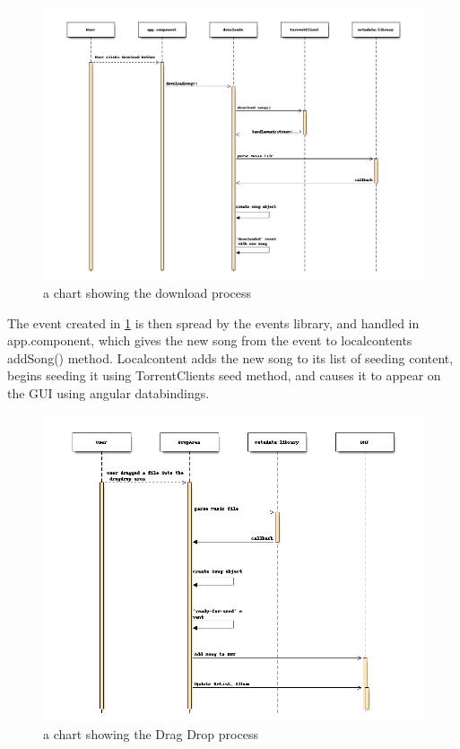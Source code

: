 \begin{figure}[H]
	\centerline{
	\includegraphics[width=1.5\linewidth]{gfx/downloadsong.png}
	}
	\caption{a chart showing the download process}
	\label{fig:downloadsong}
\end{figure}

The event created in \ref{fig:downloadsong} is then spread by the events library,
and handled in app.component, 
which gives the new song from the event to localcontents addSong() method.
Localcontent adds the new song to its list of seeding content, 
begins seeding it using TorrentClients seed method,
and causes it to appear on the \acs{GUI} using angular databindings.

\begin{figure}[H]
	\centerline{
	\includegraphics[width=1.5\linewidth]{gfx/dragdrop.png}
	}
	\caption{a chart showing the Drag Drop process}
	\label{fig:dragdrop}
\end{figure}

